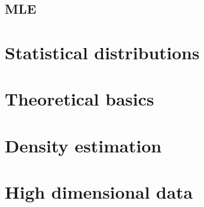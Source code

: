 \documentclass[12pt,a4paper]{amsart}
\theoremstyle{definition}
\theoremstyle{remark}
\numberwithin{equation}{section}
\begin{document}
\subsection{MLE}

\section{Statistical distributions}



\section{Theoretical basics}



\section{Density estimation}

\section{High dimensional data}



\end{document}
